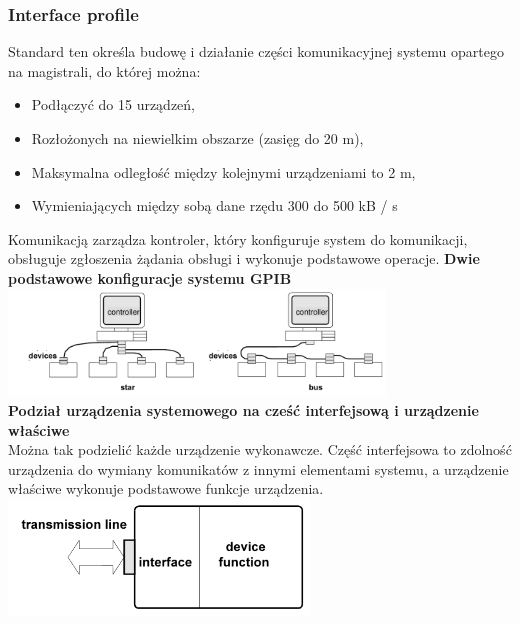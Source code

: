 \subsubsection{Interface profile}
Standard ten określa budowę i działanie części komunikacyjnej systemu opartego na magistrali, do której można:
\begin{itemize}
	\item Podłączyć do 15 urządzeń,
	\item Rozłożonych na niewielkim obszarze (zasięg do 20 m),
	\item Maksymalna odległość między kolejnymi urządzeniami to 2 m,
	\item Wymieniających między sobą dane rzędu 300 do 500 kB / s
\end{itemize}
Komunikacją zarządza kontroler, który konfiguruje system do komunikacji, obsługuje zgłoszenia żądania obsługi i wykonuje podstawowe operacje.
\textbf{Dwie podstawowe konfiguracje systemu GPIB}\\
\includegraphics[width=10cm]{./wyklady/IEEE488_SCPI_2_1.pdf}\\
\textbf{Podział urządzenia systemowego na cześć interfejsową i urządzenie właściwe}\\
Można tak podzielić każde urządzenie wykonawcze. Część interfejsowa to zdolność urządzenia do wymiany komunikatów z innymi elementami systemu, a urządzenie właściwe wykonuje podstawowe funkcje urządzenia.\\
\includegraphics[width=8cm]{./wyklady/IEEE488_SCPI_2_2.pdf}


